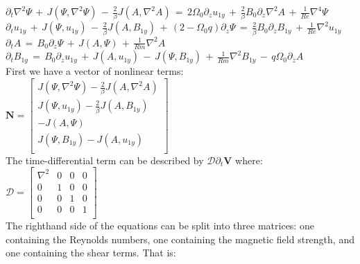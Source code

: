 \documentclass[letterpaper,12pt]{article}
\newcommand\reye{\mathrel{Re}}
\newcommand\reym{\mathrel{Rm}}
\begin{document}
$\partial_t \nabla^2 \Psi \, + \, J\left(\Psi, \nabla^2 \Psi\right) \, - \, \frac{2}{\beta}J\left(A, \nabla^2 A \right) \, =  \, 2 \Omega_0 \partial_z u_{1y} \,+ \, \frac{2}{\beta} B_0 \partial_z \nabla^2 A \, + \, \frac{1}{\reye}\nabla^4 \Psi$ \\

$\partial_t u_{1y} \, + \, J\left(\Psi, u_{1y}\right) \, - \, \frac{2}{\beta} J\left(A, B_{1y}\right) \, + \, \left(2 - \Omega_0 q\right) \partial_z \Psi \, = \, \frac{2}{\beta}B_0\partial_z B_{1y} \, + \, \frac{1}{\reye} \nabla^2 u_{1y}$ \\

$\partial_t A \, = \, B_0 \partial_z \Psi \, + \, J\left(A, \Psi\right) \, + \, \frac{1}{Rm} \nabla^2 A$ \\

$\partial_t B_{1y} \, = \, B_0 \partial_z u_{1y} \, + \, J\left(A, u_{1y}\right) \, - \, J\left(\Psi, B_{1y}\right) \, + \, \frac{1}{\reym} \nabla^2 B_{1y}  \, - \, q \Omega_0 \partial_z A$ \\

First we have a vector of nonlinear terms:\\

$\mathbf{N} = \left[ \begin{matrix}  J(\Psi, \nabla^2 \Psi) - \frac{2}{\beta}J(A, \nabla^2 A)\\
J(\Psi, u_{1y}) - \frac{2}{\beta} J(A, B_{1y}) \\ 
-J(A, \Psi) \\
J(\Psi, B_{1y}) - J(A, u_{1y}) \\
\end{matrix} \right]$ \\

The time-differential term can be described by $\mathcal{D}\partial_t \mathbf{V}$ where: \\

$\mathcal{D} = \left[\begin{matrix}
\nabla^2 & 0 & 0 & 0 \\
0 & 1& 0 & 0 \\
0 & 0 & 1 & 0\\
0 & 0 & 0 & 1 \\
\end{matrix}\right]$ \\

The righthand side of the equations can be split into three matrices: one containing the Reynolds numbers, one containing the magnetic field strength, and one containing the shear terms. That is: \\
\end{document}

